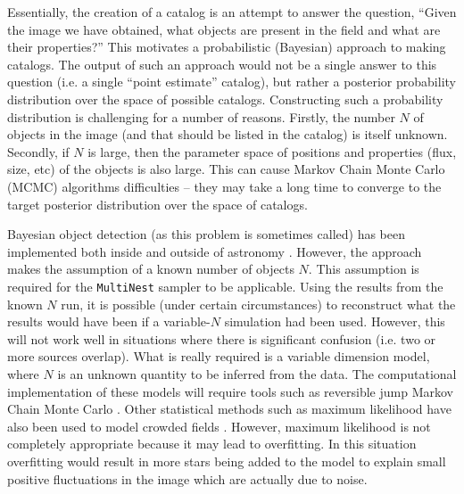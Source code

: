 \documentclass[manuscript]{aastex}
\begin{document}
Essentially, the creation of a catalog is an attempt to answer the question,
``Given the image we have obtained, what objects are present in the field and
what are their properties?'' This motivates a probabilistic (Bayesian)
approach to making catalogs. The output of such an approach would not be a
single answer to this question (i.e. a single ``point estimate'' catalog), but rather a posterior probability distribution over the space of possible catalogs.
Constructing such a probability distribution is
challenging for a number of reasons. Firstly, the number $N$ of objects in the
image (and that should be listed in the catalog) is itself unknown. Secondly, if $N$ is large, then the parameter space
of positions and properties (flux, size, etc) of the objects is also large.
This can cause Markov Chain Monte Carlo (MCMC) algorithms difficulties -- they
may take a long time to converge to the target posterior distribution over
the space of catalogs.

Bayesian object detection (as this problem is sometimes called) has been
implemented both inside and outside of astronomy
\citep[e.g.][]{object, 2011MNRAS.415.3462F}. However, the 
\citet{2011MNRAS.415.3462F} approach makes the assumption of a
known number of objects $N$.
This assumption is required for the
{\tt MultiNest} sampler \citep{multinest} to be applicable.
Using the results from the known $N$
run, it is possible (under certain circumstances) to reconstruct what the
results would have been if a variable-$N$ simulation had been used. However,
this will not work well in situations where there is significant confusion
(i.e. two or more sources overlap). What is really required is a variable
dimension model, where $N$ is an unknown quantity to be inferred from the data.
The computational implementation of these models will require tools such as
reversible jump Markov Chain Monte Carlo \citep{rjmcmc}. Other statistical
methods such as maximum likelihood have also been used to model crowded fields
\citep[e.g.][]{irwin}. However, maximum likelihood is not completely appropriate
because it may lead to overfitting. In this situation overfitting would result
in more stars being added to the model to explain small positive fluctuations
in the image which are actually due to noise.
\end{document}
